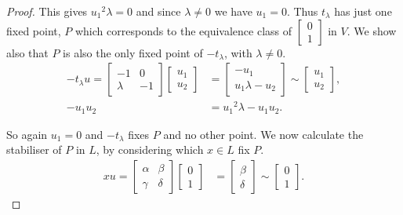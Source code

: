 \begin{proof}
This gives ${u_1}^2 \lambda = 0$ and since $\lambda \neq 0$ we have $u_1 = 0$. Thus $t_\lambda$ has just one fixed point, $P$ which corresponds to the equivalence class of $\begin{bmatrix} 0 \\ 1 \end{bmatrix}$ in $V$. We show also that $P$ is also the only fixed point of $-t_\lambda$, with $\lambda \neq 0$.
\begin{align*} -t_\lambda u = \begin{bmatrix} -1 & 0 \\ \lambda & -1 \end{bmatrix} \begin{bmatrix} u_1 \\ u_2 \end{bmatrix} &= \begin{bmatrix} -u_1 \\ u_1 \lambda - u_2 \end{bmatrix} \sim \begin{bmatrix} u_1 \\ u_2 \end{bmatrix}, 
\\[1.5ex] -u_1 u_2 &= {u_1}^2 \lambda - u_1 u_2.
\end{align*}

So again $u_1 =0$ and $-t_\lambda$ fixes $P$ and no other point. We now calculate the stabiliser of $P$ in $L$, by considering which $x \in L$ fix $P$. \\
\begin{align*} x u = \begin{bmatrix} \alpha & \beta \\ \gamma & \delta \end{bmatrix} \begin{bmatrix} 0 \\ 1 \end{bmatrix} &= \begin{bmatrix} \beta \\ \delta \end{bmatrix} \sim \begin{bmatrix} 0 \\ 1 \end{bmatrix}.
\end{align*}


\end{proof}
